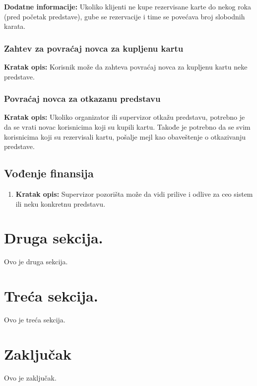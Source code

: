 \documentclass[a4paper]{article}
\begin{document}
\noindent\textbf{Dodatne informacije:} Ukoliko klijenti ne kupe rezervisane karte do nekog roka (pred početak predstave),
gube se rezervacije i time se povećava broj slobodnih karata.

\subsubsection{Zahtev za povraćaj novca za kupljenu kartu}  
\noindent\textbf{Kratak opis:} Korisnik može da zahteva povraćaj novca za kupljenu kartu neke predstave.

\subsubsection{Povraćaj novca za otkazanu predstavu}
\noindent\textbf{Kratak opis:} Ukoliko organizator ili supervizor otkažu predstavu, potrebno je
da se vrati novac korisnicima koji su kupili kartu. Takođe je potrebno da se svim korisnicima koji
su rezervisali kartu, pošalje mejl kao obaveštenje o otkazivanju predstave.

\subsection{Vođenje finansija}
\begin{enumerate}
  \item \textbf{Kratak opis:} Supervizor pozorišta može da vidi prilive i odlive za ceo sistem ili
        neku konkretnu predstavu. 
\end{enumerate}

\section{Druga sekcija.}
Ovo je druga sekcija.

\section{Treća sekcija.}
Ovo je treća sekcija.

\section{Zaključak}
Ovo je zaključak.

\newpage

\appendix
 

\end{document}
